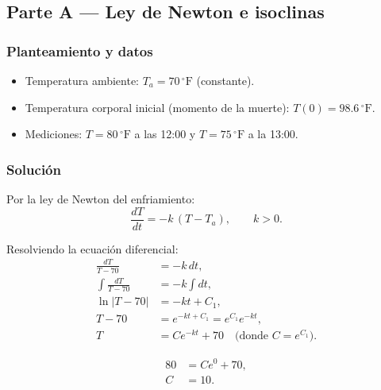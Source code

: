 \documentclass[a4paper,10pt]{article}
\begin{document}
	\subsection{Parte A --- Ley de Newton e isoclinas}\label{sub:parteA}

	\subsubsection{Planteamiento y datos}
	\medskip
	\begin{itemize}
		\item Temperatura ambiente: $T_a = 70\,^{\circ}\mathrm{F}$ (constante).
		\item Temperatura corporal inicial (momento de la muerte): $T(0)=98.6\,^{\circ}\mathrm{F}$.
		\item Mediciones: $T=80\,^{\circ}\mathrm{F}$ a las 12:00 y $T=75\,^{\circ}\mathrm{F}$ a la 13:00.
	\end{itemize}

	\subsubsection{Solución}
	\medskip
	Por la ley de Newton del enfriamiento:
\begin{equation}\label{eq:newton}
    \frac{dT}{dt} = -k\,(T-T_a),\qquad k>0.
\end{equation}

Resolviendo la ecuación diferencial:
\begin{align}
    \frac{dT}{T - 70} &= -k \, dt, \\
    \int\frac{dT}{T - 70} &= -k \int dt,\\
    \ln|T - 70| &= -kt + C_1,\\
    T - 70 &= e^{-kt + C_1} = e^{C_1}e^{-kt},\\
    T &= Ce^{-kt} + 70 \quad \text{(donde } C = e^{C_1}\text{)}.
\end{align}

\vspace{0.5em}

\begin{align}
    80 &= Ce^{0} + 70,\\
    C &= 10.
\end{align}

\vspace{0.5em}
\end{document}
